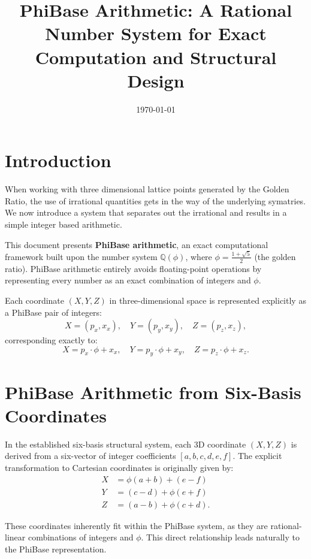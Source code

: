 \documentclass{article}
\begin{document}
\title{PhiBase Arithmetic: A Rational Number System for Exact Computation and Structural Design}
\author{}
\date{\today}

\maketitle

\section*{Introduction}

When working with three dimensional lattice points generated by the Golden Ratio, the use of irrational quantities gets in the way of the underlying symatries.  We now introduce a system that separates out the irrational and results in a simple integer based arithmetic.


This document presents \textbf{PhiBase arithmetic}, an exact computational framework built upon the number system $\mathbb{Q}(\phi)$, where $\phi = \frac{1+\sqrt{5}}{2}$ (the golden ratio). PhiBase arithmetic entirely avoids floating-point operations by representing every number as an exact combination of integers and $\phi$.

Each coordinate $(X, Y, Z)$ in three-dimensional space is represented explicitly as a PhiBase pair of integers:
\[
X = (p_x, x_x),\quad Y = (p_y, x_y),\quad Z = (p_z, x_z),
\]
corresponding exactly to:
\[
X = p_x \cdot \phi + x_x,\quad Y = p_y \cdot \phi + x_y,\quad Z = p_z \cdot \phi + x_z.
\]

\section*{PhiBase Arithmetic from Six-Basis Coordinates}

In the established six-basis structural system, each 3D coordinate $(X, Y, Z)$ is derived from a six-vector of integer coefficients $[a,b,c,d,e,f]$. The explicit transformation to Cartesian coordinates is originally given by:
\begin{align*}
X &= \phi(a + b) + (e - f) \\
Y &= (c - d) + \phi(e + f) \\
Z &= (a - b) + \phi(c + d).
\end{align*}

These coordinates inherently fit within the PhiBase system, as they are rational-linear combinations of integers and $\phi$. This direct relationship leads naturally to the PhiBase representation.
\end{document}
